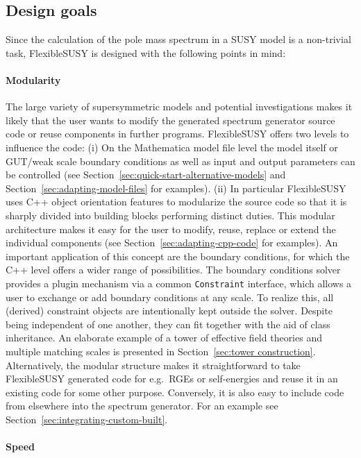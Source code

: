 \documentclass[final,3p,11pt,pdflatex]{elsarticle}
\makeatletter
\newcommand{\fs}{FlexibleSUSY\@\xspace}
\newcommand{\mathematica}{Mathematica\xspace}
\newcommand{\code}[1]{\lstinline|#1|}  %
\newcommand{\secref}[1]{Section~\ref{#1}}
\makeatother
\begin{document}
\subsection{Design goals}

Since the calculation of the pole mass spectrum in a SUSY model is a
non-trivial task, \fs is designed with the following points in mind:

\paragraph{Modularity}

The large variety of supersymmetric models and potential
investigations makes it likely that the user wants to modify the
generated spectrum generator source code or reuse components in
further programs.  \fs offers two levels to influence the code: (i) On
the \mathematica model file level the model itself or GUT/weak scale
boundary conditions as well as input and output parameters can be
controlled (see \secref{sec:quick-start-alternative-models} and
\secref{sec:adapting-model-files} for examples).  (ii) In particular
\fs uses C++ object orientation features to modularize the source code
so that it is sharply divided into building blocks performing
distinct duties.
This modular architecture makes it easy
for the user to modify, reuse, replace or
extend the individual components (see \secref{sec:adapting-cpp-code}
for examples).  An important application of this concept are the
boundary conditions, for which the C++ level offers a wider range of
possibilities.  The boundary conditions solver provides a plugin
mechanism via a common \code{Constraint} interface, which allows a
user to exchange or add boundary conditions at any scale.
To realize this, all (derived) constraint objects are intentionally
kept outside the solver.  Despite being independent of one another,
they can fit together with the aid of class inheritance.  An
elaborate example of a tower of effective field theories and multiple
matching scales is presented in \secref{sec:tower construction}.
Alternatively, the modular structure makes it straightforward to take
\fs generated code for e.g.\ RGEs or self-energies and reuse it in an
existing code for some other purpose.  Conversely, it is also easy to
include code from elsewhere into the spectrum generator.  For an
example see \secref{sec:integrating-custom-built}.

\paragraph{Speed}
\end{document}
